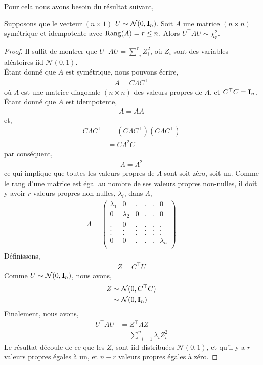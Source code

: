 Pour cela nous avons besoin du résultat suivant,
\begin{lemme}
Supposons que le vecteur $(n\times 1)$ $U\sim\mathcal{N}(0, \mathbf{I}_n)$. Soit $A$ une matrice $(n\times n)$ symétrique et idempotente avec $\mathrm{Rang}(A) = r \leq n$. Alors $U^\top A U \sim \chi^2_r$.
\label{le1}
\end{lemme}
\begin{proof}
Il suffit de montrer que $U^\top A U = \underset{i}{\overset{r}{\sum}} Z_i^2$, où $Z_i$ sont des variables aléatoires iid $\mathcal{N}(0,1)$.\\
\'Etant donné que $A$ est symétrique, nous pouvons écrire,
\begin{align*}
A = C\Lambda C^\top
\end{align*}
où $\Lambda $ est une matrice diagonale $(n\times n)$ des valeurs propres de $A$, et $C^\top C=\mathbf{I}_n$. \'Etant donné que $A$ est idempotente,
\begin{align*}
A = AA
\end{align*}
et,
\begin{align*}
 C\Lambda C^\top &= ( C\Lambda C^\top)( C\Lambda C^\top)\\
 &=C\Lambda^2C^\top
\end{align*}
par conséquent,
\begin{align*}
\Lambda=\Lambda^2
\end{align*}
ce qui implique que toutes les valeurs propres de $\Lambda$ sont soit zéro, soit un. Comme le rang d'une matrice est égal au nombre de ses valeurs propres non-nulles, il doit y avoir $r$ valeurs propres non-nulles, $\lambda_i$, dans $\Lambda$,
\begin{align*}
\Lambda=
\left(
\begin{array}{cccccc}
\lambda_1&0&.&.&.&0\\
0&\lambda_2&0&.&.&0\\
.&0&.&.&.&.\\
.&.&.&.&.&.\\
.&.&.&.&.&.\\
0&0&.&.&.&\lambda_n\\
\end{array}
\right)
\end{align*}
Définissons,
\begin{align*}
Z = C^\top U
\end{align*}
Comme $U\sim\mathcal{N}(0, \mathbf{I}_n)$, nous avons,
\begin{align*}
Z &\sim  \mathcal{N}(0, C^\top C)\\
&\sim  \mathcal{N}(0, \mathbf{I}_n)
\end{align*}
Finalement, nous avons,
\begin{align*}
U^\top AU &= Z^\top\Lambda Z\\
&=\underset{i=1}{\overset{n}{\sum}} \lambda_iZ_i^2
\end{align*}
Le résultat découle de ce que les $Z_i$ sont iid distribuées $\mathcal{N}(0,1)$, et qu'il y a $r$ valeurs propres égales à un, et $n-r$ valeurs propres égales à zéro.
\end{proof}
